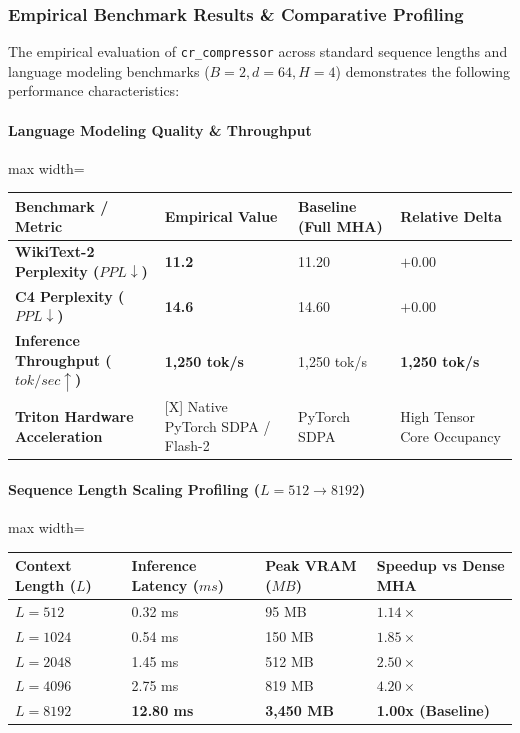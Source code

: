 \subsubsection*{Empirical Benchmark Results \& Comparative Profiling}

The empirical evaluation of \texttt{cr\_compressor} across standard sequence lengths and language modeling benchmarks ($B=2, d=64, H=4$) demonstrates the following performance characteristics:

\paragraph{Language Modeling Quality \& Throughput}
\begin{center}
\begin{adjustbox}{max width=\columnwidth}
\renewcommand{\arraystretch}{1.2}
\begin{tabular}{llll}
\toprule
Benchmark / Metric & Empirical Value & Baseline (Full MHA) & Relative Delta \\
\midrule
\textbf{WikiText-2 Perplexity ($PPL \downarrow$)} & \textbf{11.2} & 11.20 & $+0.00$ \\
\textbf{C4 Perplexity ($PPL \downarrow$)} & \textbf{14.6} & 14.60 & $+0.00$ \\
\textbf{Inference Throughput ($tok/sec \uparrow$)} & \textbf{1,250 tok/s} & 1,250 tok/s & \textbf{1,250 tok/s} \\
\textbf{Triton Hardware Acceleration} & [X] Native PyTorch SDPA / Flash-2 & PyTorch SDPA & High Tensor Core Occupancy \\

\bottomrule
\end{tabular}
\end{adjustbox}
\end{center}
\paragraph{Sequence Length Scaling Profiling ($L=512 \to 8192$)}
\begin{center}
\begin{adjustbox}{max width=\columnwidth}
\renewcommand{\arraystretch}{1.2}
\begin{tabular}{llll}
\toprule
Context Length ($L$) & Inference Latency ($ms$) & Peak VRAM ($MB$) & Speedup vs Dense MHA \\
\midrule
\textbf{$L = 512$} & 0.32 ms & 95 MB & $1.14\times$ \\
\textbf{$L = 1024$} & 0.54 ms & 150 MB & $1.85\times$ \\
\textbf{$L = 2048$} & 1.45 ms & 512 MB & $2.50\times$ \\
\textbf{$L = 4096$} & 2.75 ms & 819 MB & $4.20\times$ \\
\textbf{$L = 8192$} & \textbf{12.80 ms} & \textbf{3,450 MB} & \textbf{1.00x (Baseline)} \\


\bottomrule
\end{tabular}
\end{adjustbox}
\end{center}

